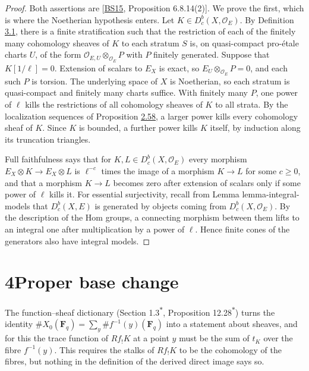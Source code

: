 \documentclass[11pt]{article}
\newcommand{\bpout}[1]{#1\textsuperscript{\hyperlink{bp-outside}{\ensuremath{\ast}}}}
\providecommand{\Dbc}{}\renewcommand{\Dbc}{D^b_c}
\begin{document}
\begin{proof}[{Proof}]\label{bp284}%
Both assertions are [\hyperref[bp705]{BS15}, Proposition 6.8.14(2)]. We prove the first, which is where the Noetherian hypothesis enters. Let \(K\in\Dbc(X,\mathcal O_E)\). By Definition \hyperref[bp199]{3.1}, there is a finite stratification such that the restriction of each of the finitely many cohomology sheaves of \(K\) to each stratum \(S\) is, on quasi-compact pro-étale charts \(U\), of the form \(\mathcal O_{E,U}\otimes_{\mathcal O_E}P\) with \(P\) finitely generated. Suppose that \(K[1/\ell]=0\). Extension of scalars to \(E_X\) is exact, so \(E_U\otimes_{\mathcal O_E}P=0\), and each such \(P\) is torsion. The underlying space of \(X\) is Noetherian, so each stratum is quasi-compact and finitely many charts suffice. With finitely many \(P\), one power of \(\ell\) kills the restrictions of all cohomology sheaves of \(K\) to all strata. By the localization sequences of Proposition \hyperref[bp181]{2.58}, a larger power kills every cohomology sheaf of \(K\). Since \(K\) is bounded, a further power kills \(K\) itself, by induction along its truncation triangles.

Full faithfulness says that for \(K,L\in\Dbc(X,\mathcal O_E)\) every morphism \(E_X\otimes K\to E_X\otimes L\) is \(\ell^{-c}\) times the image of a morphism \(K\to L\) for some \(c\geq0\), and that a morphism \(K\to L\) becomes zero after extension of scalars only if some power of \(\ell\) kills it. For essential surjectivity, recall from Lemma lemma-integral-models that \(\Dbc(X,E)\) is generated by objects coming from \(\Dbc(X,\mathcal O_E)\). By the description of the Hom groups, a connecting morphism between them lifts to an integral one after multiplication by a power of \(\ell\). Hence finite cones of the generators also have integral models.
\end{proof}



\section*{\texorpdfstring{4\quad Proper base change}{4 Proper base change}}
\label{bp285}%
\label{bp286}%
The function–sheaf dictionary (Section \bpout{1.3}, Proposition \bpout{12.28}) turns the identity \(\#X_0(\mathbf F_q)=\sum_y\#f^{-1}(y)(\mathbf F_q)\) into a statement about sheaves, and for this the trace function of \(Rf_!K\) at a point \(y\) must be the sum of \(t_K\) over the fibre \(f^{-1}(y)\). This requires the stalks of \(Rf_!K\) to be the cohomology of the fibres, but nothing in the definition of the derived direct image says so.
\end{document}
